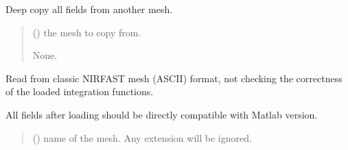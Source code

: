 \documentclass[letterpaper,10pt,english]{sphinxmanual}
\begin{document}
\begin{fulllineitems}
\begin{fulllineitems}
\begin{quote}
\begin{description}
\end{description}\end{quote}

\end{fulllineitems}


\begin{fulllineitems}
\label{\detokenize{_autosummary/nirfasterff.base.dcs_mesh.dcsmesh:nirfasterff.base.dcs_mesh.dcsmesh.from_copy}}
\pysigstartsignatures
\pysiglinewithargsret
{}
{}
{}
\pysigstopsignatures
\sphinxAtStartPar
Deep copy all fields from another mesh.
\begin{quote}\begin{description}
\sphinxAtStartPar
{} () \textendash{} the mesh to copy from.

\sphinxAtStartPar
None.

\end{description}\end{quote}

\end{fulllineitems}


\begin{fulllineitems}
\label{\detokenize{_autosummary/nirfasterff.base.dcs_mesh.dcsmesh:nirfasterff.base.dcs_mesh.dcsmesh.from_file}}
\pysigstartsignatures
\pysiglinewithargsret
{}
{}
{}
\pysigstopsignatures
\sphinxAtStartPar
Read from classic NIRFAST mesh (ASCII) format, not checking the correctness of the loaded integration functions.

\sphinxAtStartPar
All fields after loading should be directly compatible with Matlab version.
\begin{quote}\begin{description}
\sphinxAtStartPar
{} () \textendash{} name of the mesh. Any extension will be ignored.


\end{description}
\end{quote}
\end{fulllineitems}
\end{fulllineitems}
\end{document}
